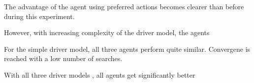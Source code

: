 









The advantage of the agent using preferred actions becomes clearer than before during this experiment.



However, with increasing complexity of the driver model, the agents 


For the simple driver model, all three agents perform quite similar. Convergene is reached with a low number of searches.


With all three driver models , all agents get significantly better 














